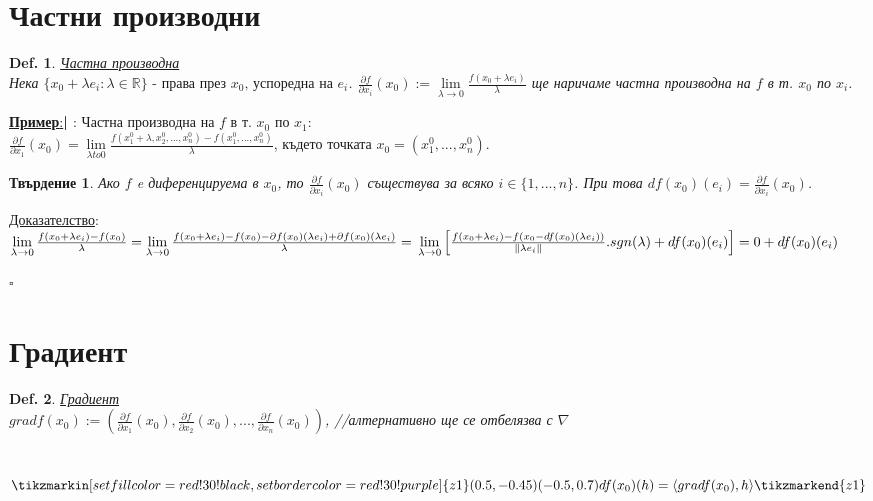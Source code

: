 \documentclass[12pt]{article}
\newcommand{\halfbox}[1]{\underline{\textbf{#1}:}\textbf{\large{| }}}
\newtheorem{proposition}{Твърдение}
\newtheorem{definition}{Def.}
\newcommand{\spc}{\text{ }}
\begin{document}
	\section*{Частни производни}
	\begin{definition}
		\underline{Частна производна}\\
		Нека $\{x_0 + \lambda e_i : \lambda \in \mathbb{R}\}\text{ - права през }x_0\text{, успоредна на }e_i$. 
		$\frac{\partial f}{\partial x_i}(x_0) := \lim\limits_{\lambda\to0}\frac{f(x_0+\lambda e_i)}{\lambda}$ ще наричаме частна производна на $f$ в т. $x_0$ по $x_i$.
	\end{definition}
	\halfbox{Пример}: Частна производна на $f$ в т. $x_0$ по $x_1$:\\
	$\frac{\partial f}{\partial x_1}(x_0) = \lim\limits_{\lambda to 0}\frac{f(x_1^0+\lambda, x_2^0, ..., x_n^0)-f(x_1^0, ..., x_n^0)}{\lambda}$, където точката $x_0 = (x_1^0, ..., x_n^0)$.
	
	\begin{proposition}
		Ако $f$ e диференцируема в $x_0$, то $\frac{\partial f}{\partial x_i}(x_0)$ съществува за всяко $i\in\{1,...,n\}$. При това $df(x_0)(e_i)=\frac{\partial f}{\partial x_i}(x_0)$.
	\end{proposition}
	\underline{Доказателство}:\\
	\begin{math}
		\lim\limits_{\lambda\to0}\frac{f(x_0+\lambda e_i)-f(x_0)}{\lambda} = \lim\limits_{\lambda\to0}\frac{f(x_0+\lambda e_i)-f(x_0)-\partial f(x_0)(\lambda e_i)+\partial f(x_0)(\lambda e_i)}{\lambda} = \\
		\lim\limits_{\lambda\to 0}\left[\frac{f(x_0+\lambda e_i) - f(x_0 - df(x_0)(\lambda e_i))}{\|\lambda e_i\|}.sgn(\lambda) + df(x_0)(e_i)\right] =
		0 + df(x_0)(e_i)
	\end{math} \begin{flushright}
		$\square$
	\end{flushright}
	
	
	\section*{Градиент}
	\begin{definition}
		\underline{Градиент}\\
		$grad f(x_0) := \left( \frac{\partial f}{\partial x_1}(x_0), \frac{\partial f}{\partial x_2}(x_0), ..., \frac{\partial f}{\partial x_n}(x_0)\right)$, \color{gray}//алтернативно ще се отбелязва с $\nabla$
		\color{white}
	\end{definition}
	$\spc$\\
	\[\tikzmarkin[set fill color=red!30!black, set border color=red!30!purple]{z1}(0.5,-0.45)(-0.5,0.7)
	df(x_0)(h) = \langle grad f(x_0), h\rangle
	\tikzmarkend{z1}\]\\
\end{document}
